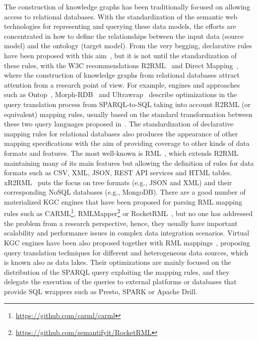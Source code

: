 The construction of knowledge graphs has been traditionally focused on allowing access to relational databases. With the standardization of the semantic web technologies for representing and querying these data models, the efforts are concentrated in how to define the relationships between the input data (source model) and the ontology (target model). From the very begging, declarative rules have been proposed with this aim~\citep{barrasa2004r2o}, but it is not until the standardization of these rules, with the W3C recommendations R2RML~\citep{R2RML} and Direct Mapping~\citep{arenas2013direct}, where the construction of knowledge graphs from relational databases attract attention from a research point of view. For example, engines and approaches such as Ontop~\citep{calvanese2017ontop}, Morph-RDB~\citep{priyatna2014formalisation} and Ultrawrap~\citep{sequeda2013ultrawrap} describe optimizations in the query translation process from SPARQL-to-SQL taking into account R2RML (or equivalent) mapping rules, usually based on the standard transformation between these two query languages proposed in~\citep{chebotko2009semantics}. The standardization of declarative mapping rules for relational databases also produces the appearance of other mapping specifications with the aim of providing coverage to other kinds of data formats and features. The most well-known is RML~\citep{dimou2014rml}, which extends R2RML maintaining many of its main features but allowing the definition of rules for data formats such as CSV, XML, JSON, REST API services and HTML tables. xR2RML~\citep{michel2015translation} puts the focus on tree formats (e.g., JSON and XML) and their corresponding NoSQL databases (e.g., MongoDB). There are a good number of materialized KGC engines that have been proposed for parsing RML mapping rules such as CARML\footnote{\url{https://github.com/carml/carml}}, RMLMapper\footnote{\url{https://github.com/semantifyit/RocketRML}} or RocketRML~\citep{csimcsek2019rocketrml}, but no one has addressed the problem from a research perspective, hence, they usually have important scalability and performance issues in complex data integration scenarios. Virtual KGC engines have been also proposed together with RML mappings~\citep{endris2019ontario,mami2019squerall}, proposing query translation techniques for different and heterogeneous data sources, which is known also as data lakes. Their optimizations are mainly focused on the distribution of the SPARQL query exploiting the mapping rules, and they delegate the execution of the queries to external platforms or databases that provide SQL wrappers such as Presto, SPARK or Apache Drill.

